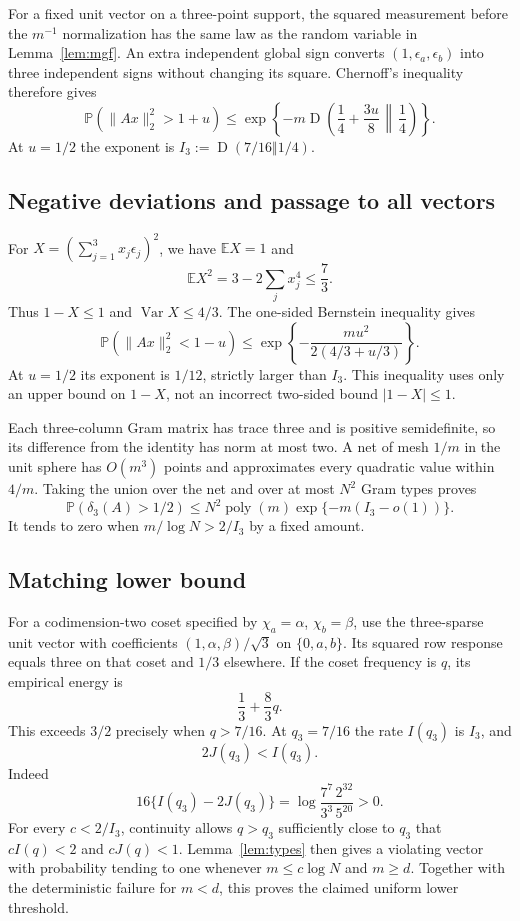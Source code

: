 \documentclass[11pt]{article}
\theoremstyle{remark}\newtheorem{remark}[theorem]{Remark}
\newcommand{\E}{\mathbb E}\newcommand{\Prob}{\mathbb P}
\newcommand{\Var}{\operatorname{Var}}\newcommand{\KL}{\operatorname{D}}
\begin{document}
For a fixed unit vector on a three-point support, the squared measurement before the $m^{-1}$ normalization has the same law as the random variable in Lemma~\ref{lem:mgf}. An extra independent global sign converts $(1,\epsilon_a,\epsilon_b)$ into three independent signs without changing its square. Chernoff's inequality therefore gives
\[
 \Prob(\|Ax\|_2^2>1+u)\le
 \exp\left\{-m\KL\left(\frac14+\frac{3u}{8}\,\middle\Vert\,\frac14\right)\right\}.
\]
At $u=1/2$ the exponent is $I_3:=\KL(7/16\Vert1/4)$.

\subsection{Negative deviations and passage to all vectors}
For $X=(\sum_{j=1}^3x_j\epsilon_j)^2$, we have $\E X=1$ and
\[
 \E X^2=3-2\sum_jx_j^4\le\frac73.
\]
Thus $1-X\le1$ and $\Var X\le4/3$. The one-sided Bernstein inequality gives
\[
 \Prob(\|Ax\|_2^2<1-u)
 \le\exp\left\{-\frac{mu^2}{2(4/3+u/3)}\right\}.
\]
At $u=1/2$ its exponent is $1/12$, strictly larger than $I_3$. This inequality uses only an upper bound on $1-X$, not an incorrect two-sided bound $|1-X|\le1$.

Each three-column Gram matrix has trace three and is positive semidefinite, so its difference from the identity has norm at most two. A net of mesh $1/m$ in the unit sphere has $O(m^3)$ points and approximates every quadratic value within $4/m$. Taking the union over the net and over at most $N^2$ Gram types proves
\[
 \Prob(\delta_3(A)>1/2)\le
 N^2\operatorname{poly}(m)\exp\{-m(I_3-o(1))\}.
\]
It tends to zero when $m/\log N>2/I_3$ by a fixed amount.

\subsection{Matching lower bound}
For a codimension-two coset specified by $\chi_a=\alpha$, $\chi_b=\beta$, use the three-sparse unit vector with coefficients $(1,\alpha,\beta)/\sqrt3$ on $\{0,a,b\}$. Its squared row response equals three on that coset and $1/3$ elsewhere. If the coset frequency is $q$, its empirical energy is
\[
 \frac13+\frac83q.
\]
This exceeds $3/2$ precisely when $q>7/16$. At $q_3=7/16$ the rate $I(q_3)$ is $I_3$, and
\[
 2J(q_3)<I(q_3).
\]
Indeed
\[
 16\{I(q_3)-2J(q_3)\}
 =\log\frac{7^7\,2^{32}}{3^3\,5^{20}}>0.
\]
For every $c<2/I_3$, continuity allows $q>q_3$ sufficiently close to $q_3$ that $cI(q)<2$ and $cJ(q)<1$. Lemma~\ref{lem:types} then gives a violating vector with probability tending to one whenever $m\le c\log N$ and $m\ge d$. Together with the deterministic failure for $m<d$, this proves the claimed uniform lower threshold.
\end{document}
